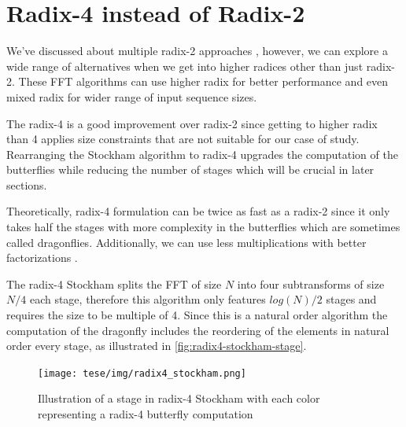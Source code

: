 \documentclass[
  oneside,
  11pt, a4paper,
  footinclude=true,
  headinclude=true,
  cleardoublepage=empty
]{scrbook}
\begin{document}
\section{Radix-4 instead of Radix-2} \label{subsec:radix4-instead-of-radix2}
We've discussed about multiple radix-2 approaches , however, we can explore a wide range of alternatives when we get into higher radices other than just radix-2. These FFT algorithms can use higher radix for better performance and even mixed radix \cite{singleton1969algorithm} for wider range of input sequence sizes.

The radix-4 is a good improvement over radix-2 since getting to higher radix than 4 applies size constraints that are not suitable for our case of study. Rearranging the Stockham algorithm to radix-4 upgrades the computation of the butterflies while reducing the number of stages which will be crucial in later sections.

Theoretically, radix-4 formulation can be twice as fast as a radix-2 \cite{hussain2010evaluation} since it only takes half the stages with more complexity in the butterflies which are sometimes called dragonflies. Additionally, we can use less multiplications with better factorizations \cite{marti2009radix}.

The radix-4 Stockham splits the FFT of size $N$ into four subtransforms of size $N/4$ each stage, therefore  this algorithm only features $log(N)/2$ stages and requires the size to be multiple of 4. Since this is a natural order algorithm the computation of the dragonfly includes the reordering of the elements in natural order every stage, as illustrated in \autoref{fig:radix4-stockham-stage}.

\begin{figure}[h] 
    \centering
    \texttt{[image: tese/img/radix4\_stockham.png]}
    \caption{Illustration of a stage in radix-4 Stockham with each color representing a radix-4 butterfly computation}
    \label{fig:radix4-stockham-stage}
\end{figure}
\end{document}
